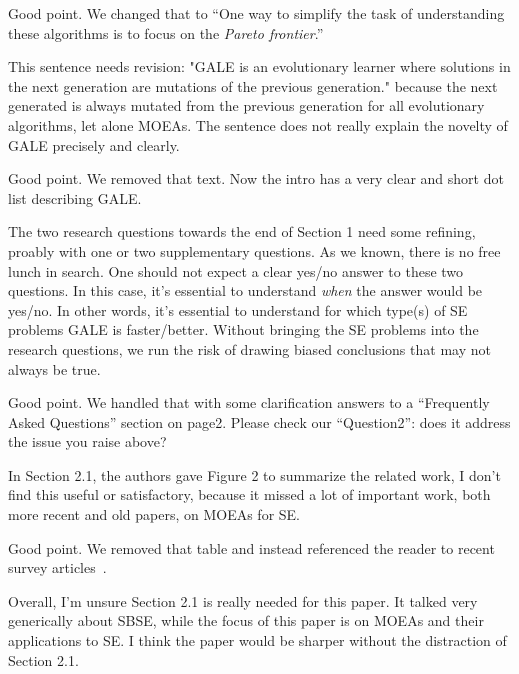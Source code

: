 \documentclass[10pt,journal,compsoc]{IEEEtran}
\newenvironment{changed}{\par\color{MyDarkBlue}}{\par}
\begin{document}
\begin{changed}
Good point. We changed that to 
``One way to simplify the task of understanding these
algorithms is to focus on the {\em Pareto frontier}.''
\end{changed}

This sentence needs revision: "GALE is an evolutionary learner where
solutions in the next generation are mutations of the previous
generation." because the next generated is always mutated from the
previous generation for all evolutionary algorithms, let alone MOEAs. The
sentence does not really explain the novelty of GALE precisely and
clearly.

\begin{changed}
Good point. We removed that text. Now the intro has a very clear and short
dot list describing GALE.
\end{changed}


The two research questions towards the end of Section 1 need some
refining, proably with one or two supplementary questions. As we known,
there is no free lunch in search. One should not expect a clear yes/no
answer to these two questions. In this case, it's essential to understand
{\em when} the answer would be yes/no. In other words, it's essential to
understand for which type(s) of SE problems GALE is faster/better. Without
bringing the SE problems into the research questions, we run the risk of
drawing biased conclusions that may not always be true.


\begin{changed}
Good point. We handled that with some clarification answers to a ``Frequently
Asked Questions'' section on page2. Please check our ``Question2'': does it
address the issue you raise above?
\end{changed}

In Section 2.1, the authors gave Figure 2 to summarize the related work,
I don't find this useful or satisfactory, because it missed a lot of
important work, both more recent and old papers, on MOEAs for SE.


\begin{changed}
Good point. We removed that table and instead referenced the reader 
to recent survey articles~\cite{harman12abc,harman14}.
\end{changed}

Overall, I'm unsure Section 2.1 is really needed for this paper. It
talked very generically about SBSE, while the focus of this paper is on
MOEAs and their applications to SE. I think the paper would be sharper
without the distraction of Section 2.1.
\end{document}
